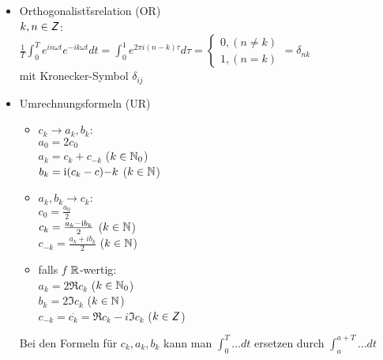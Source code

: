 \documentclass[nocolor,german]{latex4ei/latex4ei_sheet}
\begin{document}
\begin{itemize}
        \item Orthogonalist\"tsrelation (OR)\\
                $k,n \in \operatorname{\textsf{\textit{Z}}}$:\\
			$\frac{1}{T} \int_0^T e^{i n \omega t} e^{-i k \omega t} d t=\int_0^1 e^{2 \pi i (n-k) \tau} d \tau=\begin{cases} 0, (n\neq k)\\1, (n=k)\end{cases}=\delta_{n k}$\\
                mit Kronecker-Symbol $\delta_{i j}$
        \item Umrechnungsformeln (UR)
                \begin{itemize}
                        \item $c_k \to a_k,b_k$:\\
								$a_0=2 c_0$\\
                                $a_k=c_k+c_{-k}$ ($k \in \operatorname{\mathbb N}_0$)\\
                                $b_k=\mathrm{i}(c_k-c){-k}$ ($k \in \operatorname{\mathbb N}$)
                        \item $a_k,b_k \to c_k$:\\
                                $c_0=\frac{a_0}{2}$\\
                                $c_k=\frac{a_k-\mathrm{i} b_k}{2}$ ($k \in \operatorname{\mathbb N}$)\\
                                $c_{-k}=\frac{a_k+i b_k}{2}$ ($k \in \operatorname{\mathbb N}$)
                        \item falls $f$ $\operatorname{\mathbb R}$-wertig:\\
                                $a_k=2 \Re{c_k}$ ($k \in \operatorname{\mathbb N}_0$)\\
                                $b_k=2 \Im{c_k}$ ($k \in \operatorname{\mathbb N}$)\\
								$c_{-k}=\overline{c_k}=\Re{c_k}-i \Im{c_k}$ ($k \in \operatorname{\textsf{\textit{Z}}}$)
				\end{itemize}
Bei den Formeln f\"ur $c_k,a_k,b_k$ kann man $\int_0^T \ldots d t$ ersetzen durch $\int_a^{a+T} \ldots d t$\\
\end{itemize}
\end{document}
